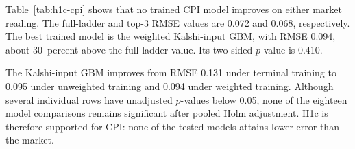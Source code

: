 \documentclass[12pt,a4paper]{report}
\begin{document}
Table~\ref{tab:h1c-cpi} shows that no trained CPI model improves on either
market reading. The full-ladder and top-3 RMSE values are 0.072 and 0.068,
respectively. The best trained model is the weighted Kalshi-input GBM, with
RMSE 0.094, about 30~percent above the full-ladder value. Its two-sided
$p$-value is 0.410.

The Kalshi-input GBM improves from RMSE 0.131 under terminal training to 0.095
under unweighted training and 0.094 under weighted training. Although several
individual rows have unadjusted $p$-values below 0.05, none of the eighteen
model comparisons remains significant after pooled Holm adjustment. H1c is
therefore supported for CPI: none of the tested models attains lower error than
the market.

\end{document}
